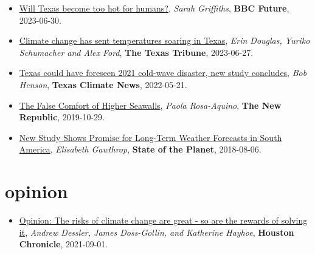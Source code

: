 \documentclass[10pt,oneside]{article}
\begin{document}
\begin{itemize}[label={}]
  
  \item \href{https://www.bbc.com/future/article/20230630-will-texas-become-too-hot-for-humans}{Will Texas become too hot for humans?}, \textit{Sarah Griffiths}, \textbf{BBC Future}, 2023-06-30.
        
  \item \href{https://www.texastribune.org/2023/06/27/texas-climate-change-heat/}{Climate change has sent temperatures soaring in Texas}, \textit{Erin Douglas, Yuriko Schumacher and Alex Ford}, \textbf{The Texas Tribune}, 2023-06-27.
        
  \item \href{https://texasclimatenews.org/2022/05/21/texas-could-have-foreseen-2021-cold-wave-disaster-new-study-concludes/}{Texas could have foreseen 2021 cold-wave disaster, new study concludes}, \textit{Bob Henson}, \textbf{Texas Climate News}, 2022-05-21.
        
  \item \href{https://newrepublic.com/article/155519/false-comfort-higher-seawalls}{The False Comfort of Higher Seawalls}, \textit{Paola Rosa-Aquino}, \textbf{The New Republic}, 2019-10-29.
        
  \item \href{https://blogs.ei.columbia.edu/2018/08/06/subseasonal-weather-forecasts-paraguay/}{New Study Shows Promise for Long-Term Weather Forecasts in South America}, \textit{Elisabeth Gawthrop}, \textbf{State of the Planet}, 2018-08-06.
        
\end{itemize}

\section{opinion}

\mbox{}\vspace{-\dimexpr\baselineskip\relax}

\begin{itemize}[label={}]
  
  \item \href{https://www.houstonchronicle.com/opinion/outlook/article/Opinion-The-risks-of-climate-change-are-great-16426616.php}{Opinion: The risks of climate change are great - so are the rewards of solving it}, \textit{Andrew Dessler, James Doss-Gollin, and Katherine Hayhoe}, \textbf{Houston Chronicle}, 2021-09-01.
        
\end{itemize}
\end{document}
